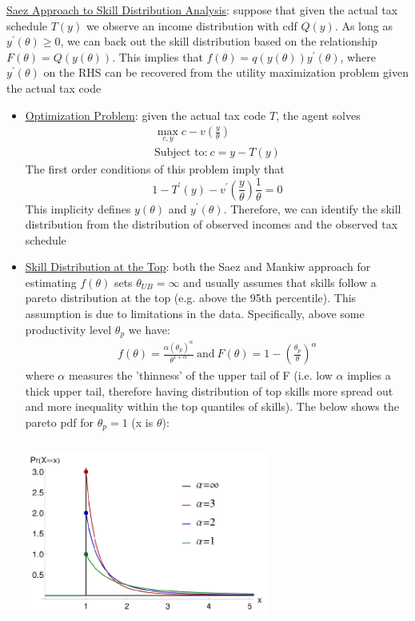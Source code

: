 \documentclass{article}
\begin{document}
\vspace{2.5mm}
\par \underline{Saez Approach to Skill Distribution Analysis}: suppose that given the actual tax schedule $T(y)$ we observe an income distribution with cdf $Q(y)$. As long as $y^{'}(\theta) \geq 0$, we can back out the skill distribution based on the relationship $F(\theta) = Q(y(\theta))$. This implies that $f(\theta) = q (y(\theta))y^{'}(\theta)$, where $y^{'}(\theta)$ on the RHS can be recovered from the utility maximization problem given the actual tax code
\begin{itemize}
    \item  \underline{Optimization Problem}: given the actual tax code $T$, the agent solves
    \begin{gather*}
        \max_{c,y} c - v(\frac{y}{\theta}) \\
        \text{Subject to:} \ c = y - T(y)
    \end{gather*}
    The first order conditions of this problem imply that $$1 - T^{'}(y) - v^{'}(\frac{y}{\theta})\frac{1}{\theta} = 0$$ This implicity defines $y(\theta)$ and $y^{'}(\theta)$. Therefore, we can identify the skill distribution from the distribution of observed incomes and the observed tax schedule
    \item  \underline{Skill Distribution at the Top}: both the Saez and Mankiw approach for estimating $f(\theta)$ sets $\theta_{UB} = \infty$ and usually assumes that skills follow a pareto distribution at the top (e.g. above the 95th percentile). This assumption is due to limitations in the data. Specifically, above some productivity level $\theta_{p}$ we have:
    \begin{gather*}
        f(\theta) = \frac{\alpha (\theta_{p})^{\alpha}}{\theta^{1+\alpha}} \ \text{and} \ F(\theta) = 1 - (\frac{\theta_{p}}{\theta})^{\alpha}
    \end{gather*}
    where $\alpha$ measures the 'thinness' of the upper tail of F (i.e. low $\alpha$ implies a thick upper tail, therefore having distribution of top skills more spread out and more inequality within the top quantiles of skills). The below shows the pareto pdf for $\theta_{p} = 1$ (x is $\theta$):
    \newline
    \begin{center}
    \includegraphics[width=8cm, height=6cm]{pic19}

\end{center}
\end{itemize}
\end{document}
